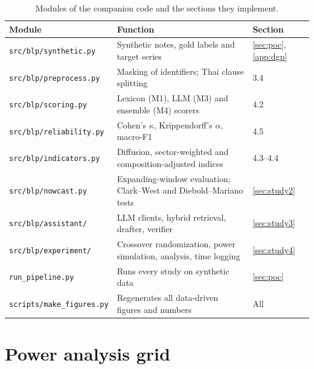 \documentclass[11pt]{article}
\begin{document}
\begin{table}[h]
\centering\small
\caption{Modules of the companion code and the sections they implement.}\label{tab:modules}
\begin{tabularx}{\textwidth}{@{}L{4.4cm}YL{1.6cm}@{}}
\toprule
Module & Function & Section \\
\midrule
\texttt{src/blp/synthetic.py} & Synthetic notes, gold labels and target series & \ref{sec:poc}, \ref{app:dgp} \\
\texttt{src/blp/preprocess.py} & Masking of identifiers; Thai clause splitting & 3.4 \\
\texttt{src/blp/scoring.py} & Lexicon (M1), LLM (M3) and ensemble (M4) scorers & 4.2 \\
\texttt{src/blp/reliability.py} & Cohen's $\kappa$, Krippendorff's $\alpha$, macro-F1 & 4.5 \\
\texttt{src/blp/indicators.py} & Diffusion, sector-weighted and composition-adjusted indices & 4.3--4.4 \\
\texttt{src/blp/nowcast.py} & Expanding-window evaluation; Clark--West and Diebold--Mariano tests & \ref{sec:study2} \\
\texttt{src/blp/assistant/} & LLM clients, hybrid retrieval, drafter, verifier & \ref{sec:study3} \\
\texttt{src/blp/experiment/} & Crossover randomization, power simulation, analysis, time logging & \ref{sec:study4} \\
\texttt{run\_pipeline.py} & Runs every study on synthetic data & \ref{sec:poc} \\
\texttt{scripts/make\_figures.py} & Regenerates all data-driven figures and numbers & All \\
\bottomrule
\end{tabularx}
\end{table}

\section{Power analysis grid}\label{app:power}
\end{document}
